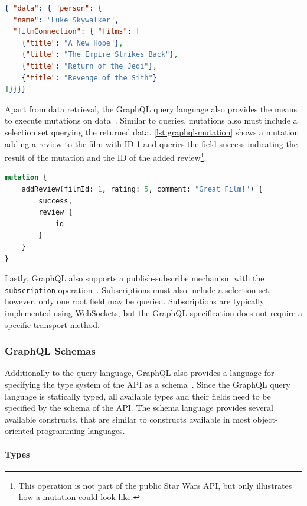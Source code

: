 \begin{lstlisting}[language=json, caption={SWAPI GraphQL Response}, label={lst:graphql-response}]
{ "data": { "person": {
  "name": "Luke Skywalker",
  "filmConnection": { "films": [
    {"title": "A New Hope"},
    {"title": "The Empire Strikes Back"},
    {"title": "Return of the Jedi"},
    {"title": "Revenge of the Sith"}
]}}}}
\end{lstlisting}

Apart from data retrieval, the GraphQL query language also provides the means to execute mutations on data~\cite{Facebook2018}.
Similar to queries, mutations also must include a selection set querying the returned data.
\autoref{lst:graphql-mutation} shows a mutation adding a review to the film with ID 1 and queries the field success indicating the result of the mutation and the ID of the added review\footnote{This operation is not part of the public Star Wars \ac{API}, but only illustrates how a mutation could look like.}.

\begin{lstlisting}[language=graphql, caption={GraphQL Mutations}, label={lst:graphql-mutation}]
mutation {
    addReview(filmId: 1, rating: 5, comment: "Great Film!") {
        success,
        review {
            id
        }
    }
}    
\end{lstlisting}

Lastly, GraphQL also supports a publish-subscribe mechanism with the \texttt{subscription} operation~\cite{Facebook2018}.
Subscriptions must also include a selection set, however, only one root field may be queried.
Subscriptions are typically implemented using WebSockets, but the GraphQL specification does not require a specific transport method.

\subsubsection{GraphQL Schemas}\label{sec:graphql-schemas}

Additionally to the query language, GraphQL also provides a language for specifying the type system of the \ac{API} as a schema~\cite{Diaz2020, Hartig2018}.
Since the GraphQL query language is statically typed, all available types and their fields need to be specified by the schema of the \ac{API}.
The schema language provides several available constructs, that are similar to constructs available in most object-oriented programming languages.

\paragraph{Types}

